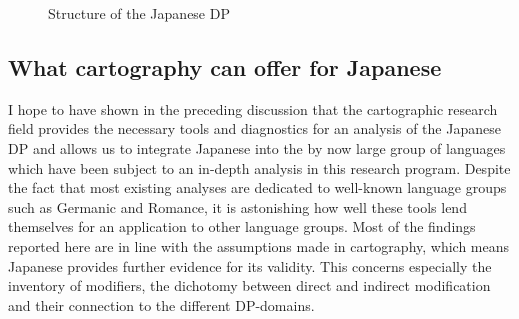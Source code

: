 \documentclass [output=book,colorlinks,citecolor=brown]{langscibook}
\begin{document}
\newpage

\begin{figure}
 \centering
 \begin{subfigure}{0.5\textwidth}
 \centering
 \end{subfigure}%
 \begin{subfigure}{0.5\textwidth}
 \centering
 \end{subfigure}
 \caption{Structure of the Japanese DP}
 \label{fig:Structure of the Japanese DP3}
\end{figure}

\subsection{What cartography can offer for Japanese}

I hope to have shown in the preceding discussion that the cartographic research field provides the necessary tools and diagnostics for an analysis of the Japanese DP and allows us to integrate Japanese into the by now large group of languages which have been subject to an in-depth analysis in this research program. Despite the fact that most existing analyses are dedicated to well-known language groups such as Germanic and Romance, it is astonishing how well these tools lend themselves for an application to other language groups. Most of the findings reported here are in line with the assumptions made in cartography, which means Japanese provides further evidence for its validity. This concerns especially the inventory of modifiers, the dichotomy between direct and indirect modification and their connection to the different DP-domains.
\end{document}
